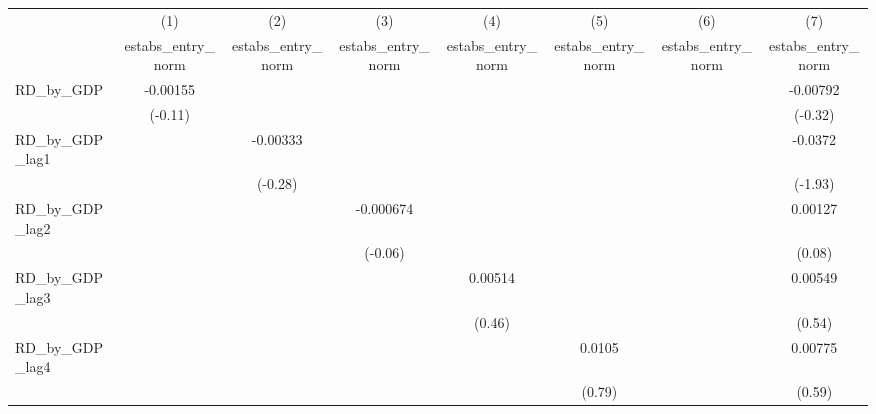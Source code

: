{
\def\sym#1{\ifmmode^{#1}\else\(^{#1}\)\fi}
\begin{tabular}{l*{7}{c}}
\toprule
          &\multicolumn{1}{c}{(1)}&\multicolumn{1}{c}{(2)}&\multicolumn{1}{c}{(3)}&\multicolumn{1}{c}{(4)}&\multicolumn{1}{c}{(5)}&\multicolumn{1}{c}{(6)}&\multicolumn{1}{c}{(7)}\\
          &\multicolumn{1}{c}{estabs\_entry\_norm}&\multicolumn{1}{c}{estabs\_entry\_norm}&\multicolumn{1}{c}{estabs\_entry\_norm}&\multicolumn{1}{c}{estabs\_entry\_norm}&\multicolumn{1}{c}{estabs\_entry\_norm}&\multicolumn{1}{c}{estabs\_entry\_norm}&\multicolumn{1}{c}{estabs\_entry\_norm}\\
\midrule
RD\_by\_GDP & -0.00155         &                  &                  &                  &                  &                  & -0.00792         \\
          &  (-0.11)         &                  &                  &                  &                  &                  &  (-0.32)         \\
\addlinespace
RD\_by\_GDP\_lag1&                  & -0.00333         &                  &                  &                  &                  &  -0.0372         \\
          &                  &  (-0.28)         &                  &                  &                  &                  &  (-1.93)         \\
\addlinespace
RD\_by\_GDP\_lag2&                  &                  &-0.000674         &                  &                  &                  &  0.00127         \\
          &                  &                  &  (-0.06)         &                  &                  &                  &   (0.08)         \\
\addlinespace
RD\_by\_GDP\_lag3&                  &                  &                  &  0.00514         &                  &                  &  0.00549         \\
          &                  &                  &                  &   (0.46)         &                  &                  &   (0.54)         \\
\addlinespace
RD\_by\_GDP\_lag4&                  &                  &                  &                  &   0.0105         &                  &  0.00775         \\
          &                  &                  &                  &                  &   (0.79)         &                  &   (0.59)         \\

\end{tabular}}
